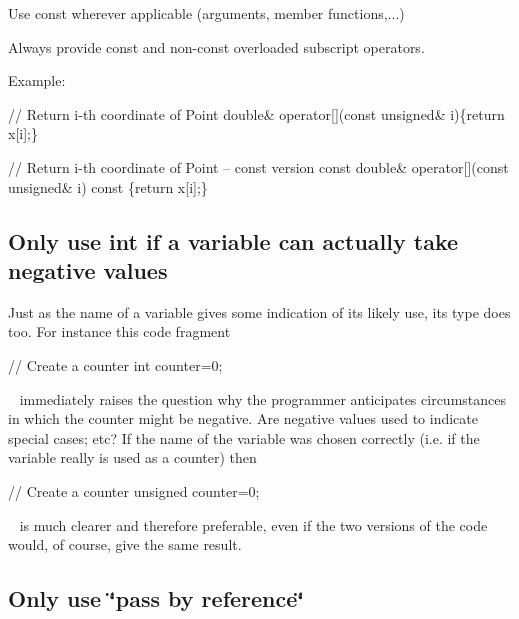 \begin{DoxyItemize}
\item Use const wherever applicable (arguments, member functions,...)
\item Always provide const and non-\/const overloaded subscript operators.
\item Example\+: 
\begin{DoxyCode}
\textcolor{comment}{// Return i-th coordinate of Point}
 \textcolor{keywordtype}{double}& operator[](\textcolor{keyword}{const} \textcolor{keywordtype}{unsigned}& i)\{\textcolor{keywordflow}{return} x[i];\}  

\textcolor{comment}{// Return i-th coordinate of Point -- const version}
\textcolor{keyword}{const} \textcolor{keywordtype}{double}& operator[](\textcolor{keyword}{const} \textcolor{keywordtype}{unsigned}& i)\textcolor{keyword}{ const }\{\textcolor{keywordflow}{return} x[i];\} 
\end{DoxyCode}

\end{DoxyItemize}\hypertarget{index_unsigned}{}\subsection{Only use int if a variable can actually take negative values}\label{index_unsigned}

\begin{DoxyItemize}
\item Just as the name of a variable gives some indication of its likely use, its type does too. For instance this code fragment ~\newline

\begin{DoxyCode}
\textcolor{comment}{// Create a counter}
\textcolor{keywordtype}{int} counter=0;
\end{DoxyCode}
 ~\newline
 immediately raises the question why the programmer anticipates circumstances in which the counter might be negative. Are negative values used to indicate special cases; etc? If the name of the variable was chosen correctly (i.\+e. if the variable really is used as a counter) then ~\newline

\begin{DoxyCode}
\textcolor{comment}{// Create a counter}
\textcolor{keywordtype}{unsigned} counter=0;
\end{DoxyCode}
 ~\newline
 is much clearer and therefore preferable, even if the two versions of the code would, of course, give the same result.
\end{DoxyItemize}\hypertarget{index_pass_by_reference}{}\subsection{Only use \char`\"{}pass by reference\char`\"{}}\label{index_pass_by_reference}


